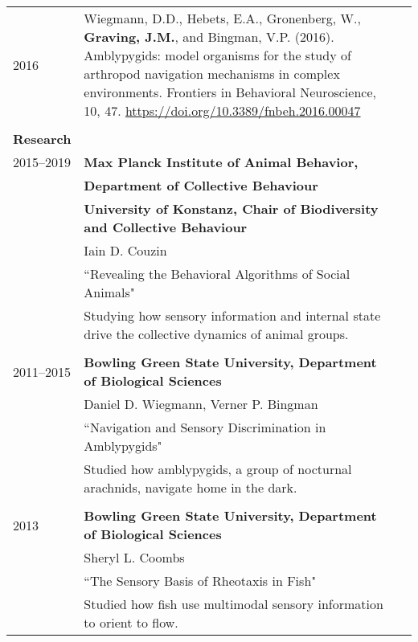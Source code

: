 \documentclass[letterpaper,7pt,oneside]{article}
\begin{document}
\begin{small}
\begin{longtable}{@{} l p{5.3in}l}
\large{2016}
& Wiegmann, D.D., Hebets, E.A., Gronenberg, W., \textbf{Graving, J.M.}, and Bingman, V.P. (2016). Amblypygids: model organisms for the study of arthropod navigation mechanisms in complex environments. Frontiers in Behavioral Neuroscience, 10, 47. \href{https://doi.org/10.3389/fnbeh.2016.00047}{https://doi.org/10.3389/fnbeh.2016.00047} \vspace{1mm} \\   

 & \\ 


 \Large{\textbf{Research}}  \vspace{5mm} \\
 
 \large{2015–2019}
     & \textbf{Max Planck Institute of Animal Behavior,}\\
     	& \textbf{Department of Collective Behaviour} \\
        & \textbf{University of Konstanz, Chair of Biodiversity and Collective Behaviour} \\
     & Iain D. Couzin \\
     & ``Revealing the Behavioral Algorithms of Social Animals"  \vspace{1mm}\\
     & \parbox{5.0in}{Studying how sensory information and internal state drive the collective dynamics of animal groups.}\\
     & \\ 
 \large{2011–2015}
     & \textbf{Bowling Green State University, Department of Biological Sciences} \\
     & Daniel D. Wiegmann, Verner P. Bingman \\
     & ``Navigation and Sensory Discrimination in Amblypygids" \vspace{1mm}\\
     & \parbox{5.0in}{Studied how amblypygids, a group of nocturnal arachnids, navigate home in the dark. }\\
     & \\
 \large{2013}
     & \textbf{Bowling Green State University, Department of Biological Sciences} \\
     & Sheryl L. Coombs \\
     & ``The Sensory Basis of Rheotaxis in Fish" \vspace{1mm}\\
     & \parbox{5.0in}{Studied how fish use multimodal sensory information to orient to flow.}\\

\end{longtable}
\end{small}
\end{document}
